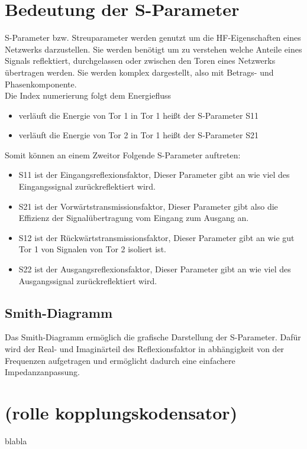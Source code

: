 \section{Bedeutung der S-Parameter}
S-Parameter bzw. Streuparameter werden genutzt um die HF-Eigenschaften eines
Netzwerks darzustellen. Sie werden benötigt um zu verstehen welche Anteile eines Signals
reflektiert, durchgelassen oder zwischen den Toren eines Netzwerks übertragen werden.
Sie werden komplex dargestellt, also mit Betrags- und Phasenkomponente.
\\
Die Index numerierung folgt dem Energiefluss
\clearpage

\begin{itemize}
    \item verläuft die Energie von Tor 1 in Tor 1 heißt der S-Parameter S11
    \item verläuft die Energie von Tor 2 in Tor 1 heißt der S-Parameter S21
\end{itemize}
Somit können an einem Zweitor Folgende S-Parameter auftreten:
\begin{itemize}
    \item S11 ist der Eingangsreflexionsfaktor, Dieser Parameter gibt an wie viel des Eingangssignal zurückreflektiert wird.
    \item S21 ist der Vorwärtstransmissionsfaktor, Dieser Parameter gibt also die Effizienz der Signalübertragung vom Eingang zum Ausgang an.
    \item S12 ist der Rückwärtstransmissionsfaktor, Dieser Parameter gibt an wie gut Tor 1 von Signalen von Tor 2 isoliert ist.
    \item S22 ist der Ausgangsreflexionsfaktor, Dieser Parameter gibt an wie viel des Ausgangssignal zurückreflektiert wird.
\end{itemize}
\subsection{Smith-Diagramm}
Das Smith-Diagramm ermöglich die grafische Darstellung der S-Parameter.
Dafür wird der Real- und Imaginärteil des Reflexionsfaktor in abhängigkeit von der Frequenzen
aufgetragen und ermöglicht dadurch eine einfachere Impedanzanpassung.
\section{(rolle kopplungskodensator)}
blabla 
\clearpage